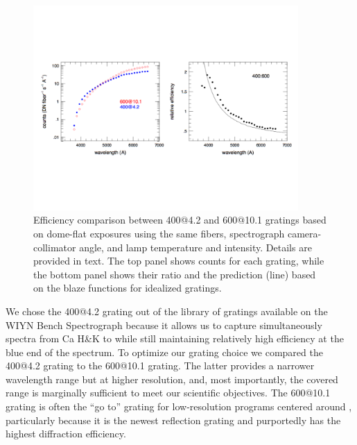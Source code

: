 \begin{appendices}
\begin{figure}[htb]
\centering
\vskip -1.25in
  \includegraphics[width=0.9\textwidth]{891_1/figs/blaze_comp_land.pdf}
\vskip -1.25in
  \caption{\label{fig:grating_comp} Efficiency comparison between
    400@4.2 and 600@10.1 gratings based on dome-flat exposures using
    the same fibers, spectrograph camera-collimator angle, and lamp
    temperature and intensity. Details are provided in text. The top
    panel shows counts for each grating, while the bottom panel shows
    their ratio and the prediction (line) based on the blaze functions
    for idealized gratings.}
\end{figure}




We chose the 400@4.2 grating out of the library of gratings available
on the WIYN Bench Spectrograph because it allows us to capture
simultaneously spectra from Ca H\&K to \Ha while still maintaining
relatively high efficiency at the blue end of the spectrum.  To
optimize our grating choice we compared the 400@4.2 grating to the
600@10.1 grating. The latter provides a narrower wavelength range but
at higher resolution, and, most importantly, the covered range is
marginally sufficient to meet our scientific objectives.  The 600@10.1
grating is often the ``go to'' grating for low-resolution programs
centered around , particularly because it is the newest
reflection grating and purportedly has the highest diffraction
efficiency.


\end{appendices}
